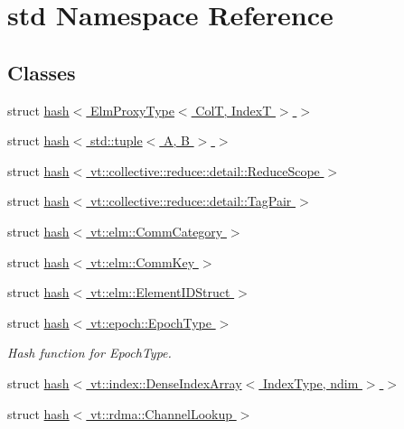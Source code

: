 \hypertarget{namespacestd}{}\section{std Namespace Reference}
\label{namespacestd}
\subsection*{Classes}
\begin{DoxyCompactItemize}
\item 
struct \hyperlink{structstd_1_1hash_3_01_elm_proxy_type_3_01_col_t_00_01_index_t_01_4_01_4}{hash$<$ Elm\+Proxy\+Type$<$ Col\+T, Index\+T $>$ $>$}
\item 
struct \hyperlink{structstd_1_1hash_3_01std_1_1tuple_3_01_a_00_01_b_01_4_01_4}{hash$<$ std\+::tuple$<$ A, B $>$ $>$}
\item 
struct \hyperlink{structstd_1_1hash_3_01vt_1_1collective_1_1reduce_1_1detail_1_1_reduce_scope_01_4}{hash$<$ vt\+::collective\+::reduce\+::detail\+::\+Reduce\+Scope $>$}
\item 
struct \hyperlink{structstd_1_1hash_3_01vt_1_1collective_1_1reduce_1_1detail_1_1_tag_pair_01_4}{hash$<$ vt\+::collective\+::reduce\+::detail\+::\+Tag\+Pair $>$}
\item 
struct \hyperlink{structstd_1_1hash_3_01vt_1_1elm_1_1_comm_category_01_4}{hash$<$ vt\+::elm\+::\+Comm\+Category $>$}
\item 
struct \hyperlink{structstd_1_1hash_3_01vt_1_1elm_1_1_comm_key_01_4}{hash$<$ vt\+::elm\+::\+Comm\+Key $>$}
\item 
struct \hyperlink{structstd_1_1hash_3_01vt_1_1elm_1_1_element_i_d_struct_01_4}{hash$<$ vt\+::elm\+::\+Element\+I\+D\+Struct $>$}
\item 
struct \hyperlink{structstd_1_1hash_3_01vt_1_1epoch_1_1_epoch_type_01_4}{hash$<$ vt\+::epoch\+::\+Epoch\+Type $>$}
\begin{DoxyCompactList}\small\item\em Hash function for {\ttfamily Epoch\+Type}. \end{DoxyCompactList}\item 
struct \hyperlink{structstd_1_1hash_3_01vt_1_1index_1_1_dense_index_array_3_01_index_type_00_01ndim_01_4_01_4}{hash$<$ vt\+::index\+::\+Dense\+Index\+Array$<$ Index\+Type, ndim $>$ $>$}
\item 
struct \hyperlink{structstd_1_1hash_3_01vt_1_1rdma_1_1_channel_lookup_01_4}{hash$<$ vt\+::rdma\+::\+Channel\+Lookup $>$}
\item 

\end{DoxyCompactItemize}
